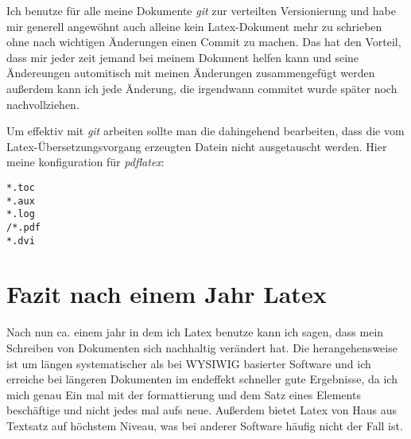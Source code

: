 Ich benutze für alle meine Dokumente \textit{git} zur verteilten Versionierung und habe mir generell angewöhnt
auch alleine kein Latex-Dokument mehr zu schrieben ohne nach wichtigen Änderungen einen Commit zu machen. Das hat
den Vorteil, dass mir jeder zeit jemand bei meinem Dokument helfen kann und seine Ändereungen automitisch mit
meinen Änderungen zusammengefügt werden außerdem kann ich jede Änderung, die irgendwann commitet wurde später noch
nachvollziehen.

Um effektiv mit \textit{git} arbeiten sollte man die  dahingehend bearbeiten, dass die vom
Latex-Übersetzungsvorgang erzeugten Datein nicht ausgetauscht werden. Hier meine konfiguration für
\textit{pdflatex}:
\begin{verbatim}
*.toc
*.aux
*.log
/*.pdf
*.dvi
\end{verbatim}

\section{Fazit nach einem Jahr Latex}
Nach nun ca. einem jahr in dem ich Latex benutze kann ich sagen, dass mein Schreiben von Dokumenten sich nachhaltig
verändert hat. Die herangehensweise ist um längen systematischer als bei WYSIWIG basierter Software und ich
erreiche bei längeren Dokumenten im endeffekt schneller gute Ergebnisse, da ich mich genau Ein mal mit der
formattierung und dem Satz eines Elements beschäftige und nicht jedes mal aufs neue. Außerdem bietet Latex
von Haus aus Textsatz auf höchstem Niveau, was bei anderer Software häufig nicht der Fall ist.

